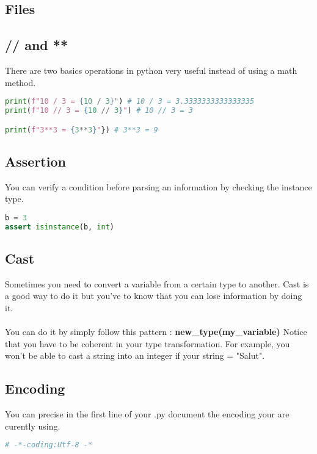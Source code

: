 \documentclass[a4paper, 12pt, titlepage]{scrartcl} %
\begin{document}
\subsection{Files}

\subsection{// and **}
There are two basics operations in python very useful instead of using a math method.
\begin{lstlisting}[language=Python]
print(f"10 / 3 = {10 / 3}") # 10 / 3 = 3.3333333333333335
print(f"10 // 3 = {10 // 3}") # 10 // 3 = 3

print(f"3**3 = {3**3}"}) # 3**3 = 9
\end{lstlisting} \vspace{5mm}

\subsection{Assertion}
\label{subsec:Assertion}
You can verify a condition before parsing an information by checking the instance type.
\begin{lstlisting}[language=Python]
b = 3
assert isinstance(b, int)
\end{lstlisting} \vspace{5mm}

\subsection{Cast}
Sometimes you need to convert a variable from a certain type to another. Cast is a good way to do it but you've to know that you can lose information by doing it. \\ \\
You can do it by simply follow this pattern : \textbf{new\_type(my\_variable)}
Notice that you have to be coherent in your type transformation. For example, you won't be able to cast a string into an integer if your string = "Salut".

\subsection{Encoding}
You can precise in the first line of your .py document the encoding your are curently using.
\begin{lstlisting}[language=Python]
# -*-coding:Utf-8 -*
\end{lstlisting} \vspace{5mm}
\end{document}

